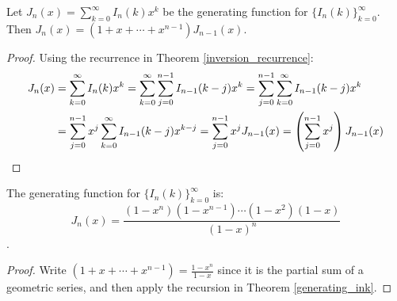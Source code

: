 \documentclass[a4paper]{article}
\begin{document}
\begin{theorem}\label{generating_ink}
Let $J_n(x)=\sum_{k=0}^\infty I_n(k)x^k$ be the generating function for $\{I_n(k)\}_{k=0}^\infty$. Then $J_n(x)=(1+x+\cdots+x^{n-1})J_{n-1}(x)$.

\begin{hl}
\begin{proof}
Using the recurrence in Theorem \ref{inversion_recurrence}:
\begin{align*}
J_n(x)
&=\sum_{k=0}^\infty I_n(k)x^k
=\sum_{k=0}^\infty\sum_{j=0}^{n-1}I_{n-1}(k-j)x^k
=\sum_{j=0}^{n-1}\sum_{k=0}^\infty I_{n-1}(k-j)x^k\\
&=\sum_{j=0}^{n-1}x^j\sum_{k=0}^\infty I_{n-1}(k-j)x^{k-j}
=\sum_{j=0}^{n-1}x^jJ_{n-1}(x)
=\left(\sum_{j=0}^{n-1}x^j\right)J_{n-1}(x)\qedhere
\end{align*}
\end{proof}
\end{hl}
\end{theorem}

\begin{corollary}
The generating function for $\{I_n(k)\}_{k=0}^\infty$ is:
\begin{equation*}
J_n(x)=\frac{(1-x^n)(1-x^{n-1})\cdots(1-x^2)(1-x)}{(1-x)^n}
\end{equation*}.

\begin{hl}
\begin{proof}
Write $(1+x+\cdots+x^{n-1})=\frac{1-x^n}{1-x}$ since it is the partial sum of a geometric series, and then apply the recursion in Theorem \ref{generating_ink}.
\end{proof}
\end{hl}
\end{corollary}
\end{document}
